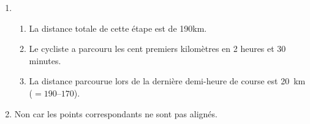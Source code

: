 
\medskip

%
%
%
%
%

\begin{enumerate}
\item 
	\begin{enumerate}
		\item %
La distance totale de cette étape est de 190km.
		\item %
Le cycliste a parcouru les cent premiers kilomètres en 2 heures et 30 minutes.
		\item %
La distance parcourue lors de la dernière demi-heure de course est 20~km ($= 190 – 170$).
	\end{enumerate}
\item  %
	
Non car les points correspondants  ne sont pas alignés.
\end{enumerate}

\vspace{0,5cm}

